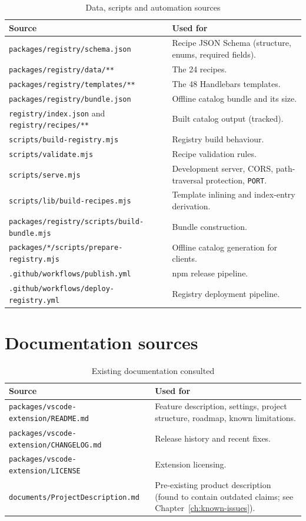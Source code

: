 \begin{longtable}{p{6.2cm}p{8cm}}
\caption{Data, scripts and automation sources}\\
\toprule
\textbf{Source} & \textbf{Used for} \\
\midrule

\texttt{packages/registry/schema.json} & Recipe JSON Schema (structure, enums,
required fields). \\
\texttt{packages/registry/data/**} & The 24 recipes. \\
\texttt{packages/registry/templates/**} & The 48 Handlebars templates. \\
\texttt{packages/registry/bundle.json} & Offline catalog bundle and its size. \\
\texttt{registry/index.json} and \texttt{registry/recipes/**} & Built catalog
output (tracked). \\
\texttt{scripts/build-registry.mjs} & Registry build behaviour. \\
\texttt{scripts/validate.mjs} & Recipe validation rules. \\
\texttt{scripts/serve.mjs} & Development server, CORS, path-traversal protection,
\texttt{PORT}. \\
\texttt{scripts/lib/build-recipes.mjs} & Template inlining and index-entry
derivation. \\
\texttt{packages/registry/scripts/build-bundle.mjs} & Bundle construction. \\
\texttt{packages/*/scripts/prepare-registry.mjs} & Offline catalog generation for
clients. \\
\texttt{.github/workflows/publish.yml} & npm release pipeline. \\
\texttt{.github/workflows/deploy-registry.yml} & Registry deployment pipeline. \\
\bottomrule
\end{longtable}

\section{Documentation sources}

\begin{longtable}{p{6.2cm}p{8cm}}
\caption{Existing documentation consulted}\\
\toprule
\textbf{Source} & \textbf{Used for} \\
\midrule

\texttt{packages/vscode-extension/README.md} & Feature description, settings,
project structure, roadmap, known limitations. \\
\texttt{packages/vscode-extension/CHANGELOG.md} & Release history and recent
fixes. \\
\texttt{packages/vscode-extension/LICENSE} & Extension licensing. \\
\texttt{documents/ProjectDescription.md} & Pre-existing product description
(found to contain outdated claims; see Chapter~\ref{ch:known-issues}). \\
\bottomrule
\end{longtable}

